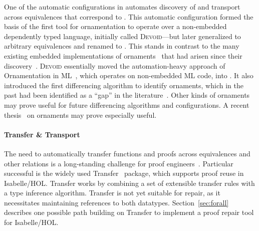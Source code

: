 One of the automatic configurations in \toolnamec automates discovery of and transport across equivalences
that correspond to .
This automatic configuration formed the basis of the first tool for ornamentation to operate over a non-embedded dependently typed language,
initially called \textsc{Devoid}---but later generalized to arbitrary equivalences and renamed to \toolnamec.
This stands in contrast to the many existing embedded implementations of 
ornaments~\cite{Dagand:2013:CTO:2591370.2591396, ko2013relational, dagand2014transporting, ko2016programming, dagand2017essence}
that had arisen since their discovery~\cite{mcbride}.
\textsc{Devoid} essentially moved the automation-heavy approach of Ornamentation in ML~\cite{Williams2017},
which operates on non-embedded ML code, into .
It also introduced the first differencing algorithm to identify ornaments, which in the past 
had been identified as a ``gap'' in the literature~\cite{ko2016programming}.
Other kinds of ornaments may prove useful for future \toolnamec differencing algorithms and configurations.
A recent thesis~\cite{williamsphd} on ornaments may prove especially useful.

\paragraph{Transfer \& Transport}
The need to automatically transfer functions and proofs across equivalences and other relations is a long-standing challenge for proof 
engineers~\cite{magaud2000changing, Barthe2001, magaud2003changing}.
Particular successful is the widely used Transfer~\cite{Huffman2013} package, which supports proof reuse in Isabelle/HOL. %
Transfer works by combining a set of extensible transfer rules with a type inference algorithm.
Transfer is not yet suitable for repair, as it necessitates maintaining references to both datatypes.
Section~\ref{sec:forall} describes one possible path building on Transfer to implement a proof repair tool for Isabelle/HOL.

